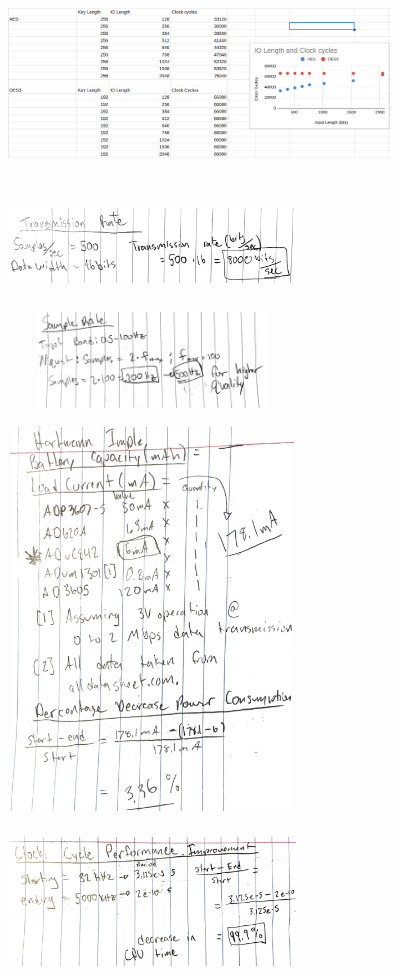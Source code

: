 \documentclass{article}
\begin{document}
\begin{figure}[h]
  \centering
  \includegraphics[width=4in, height=2in]{encryption.png}
\end{figure}

\begin{figure}[h]
  \centering
  \includegraphics[width=3in, height=1in]{transmission.png}
\end{figure}

\begin{figure}[h]
  \centering
  \includegraphics[width=3in, height=1in]{sample.png}
\end{figure}

\begin{figure}[h]
  \centering
  \includegraphics[width=3in, height=4in]{hartmann.png}
\end{figure}

\begin{figure}[h]
  \centering
  \includegraphics[width=3in, height=1.5in]{cpu.png}
\end{figure}
\end{document}

